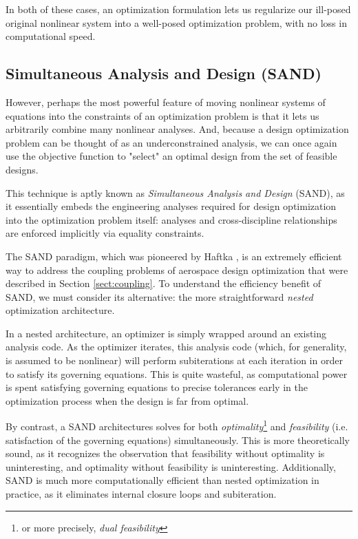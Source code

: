In both of these cases, an optimization formulation lets us regularize our ill-posed original nonlinear system into a well-posed optimization problem, with no loss in computational speed.

\subsection{Simultaneous Analysis and Design (SAND)}
\label{sect:sand}

However, perhaps the most powerful feature of moving nonlinear systems of equations into the constraints of an optimization problem is that it lets us arbitrarily combine many nonlinear analyses. And, because a design optimization problem can be thought of as an underconstrained analysis, we can once again use the objective function to "select" an optimal design from the set of feasible designs.

This technique is aptly known as \textit{Simultaneous Analysis and Design} (SAND), as it essentially embeds the engineering analyses required for design optimization into the optimization problem itself: analyses and cross-discipline relationships are enforced implicitly via equality constraints.

The SAND paradigm, which was pioneered by Haftka \cite{haftka}, is an extremely efficient way to address the coupling problems of aerospace design optimization that were described in Section \ref{sect:coupling}. To understand the efficiency benefit of SAND, we must consider its alternative: the more straightforward \textit{nested} optimization architecture.

In a nested architecture, an optimizer is simply wrapped around an existing analysis code. As the optimizer iterates, this analysis code (which, for generality, is assumed to be nonlinear) will perform subiterations at each iteration in order to satisfy its governing equations. This is quite wasteful, as computational power is spent satisfying governing equations to precise tolerances early in the optimization process when the design is far from optimal.


By contrast, a SAND architectures solves for both \textit{optimality}\footnote{or more precisely, \textit{dual feasibility}} and \textit{feasibility} (i.e. satisfaction of the governing equations) simultaneously. This is more theoretically sound, as it recognizes the observation that feasibility without optimality is uninteresting, and optimality without feasibility is uninteresting. Additionally, SAND is much more computationally efficient than nested optimization in practice, as it eliminates internal closure loops and subiteration.

